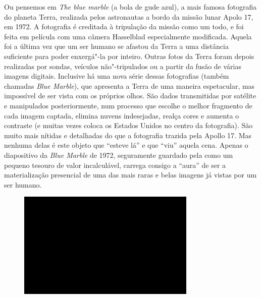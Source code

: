 Ou pensemos em \emph{The blue marble} (a bola de gude azul), a mais
famosa fotografia do planeta Terra, realizada pelos astronautas a bordo
da missão lunar Apolo 17, em 1972. A fotografia é creditada à tripulação
da missão como um todo, e foi feita em película com uma câmera
Hasselblad especialmente modificada. Aquela foi a última vez que um ser
humano se afastou da Terra a uma distância suficiente para poder
enxergá"-la por inteiro. Outras fotos da Terra foram depois realizadas
por sondas, veículos não"-tripulados ou a partir da fusão de várias
imagens digitais. Inclusive há uma nova série dessas fotografias (também
chamadas \emph{Blue Marble}), que apresenta a Terra de uma maneira
espetacular, mas impossível de ser vista com os próprios olhos. São
dados transmitidas por satélite e manipulados posteriormente, num
processo que escolhe o melhor fragmento de cada imagem captada, elimina
nuvens indesejadas, realça cores e aumenta o contraste (e muitas vezes
coloca os Estados Unidos no centro da fotografia). São muito mais
nítidas e detalhadas do que a fotografia trazida pela Apollo 17. Mas
nenhuma delas é este objeto que ``esteve lá'' e que ``viu'' aquela cena.
Apenas o diapositivo da \emph{Blue Marble} de 1972, seguramente guardado
pela  como um pequeno tesouro de valor incalculável, carrega consigo
a ``aura'' de ser a materialização presencial de uma das mais raras e
belas imagens já vistas por um ser humano.

\begin{figure}[!ht]
\centering
 \includegraphics[width=85mm]{./imgs/im1.jpg}
\caption{\tiny{}}
\end{figure}

